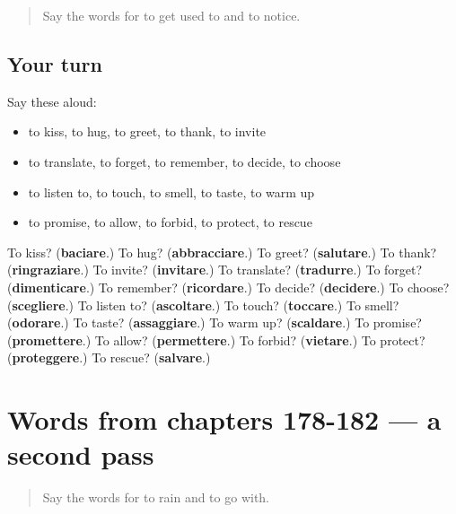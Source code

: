 \label{lesson:IT-R182-first-pass-words-from-chapters-174-177}



\begin{quote}
Say the words for to get used to and to notice.
\end{quote}

\subsection*{Your turn}
Say these aloud:

\begin{itemize}
\raggedright
  \item to kiss, to hug, to greet, to thank, to invite
  \item to translate, to forget, to remember, to decide, to choose
  \item to listen to, to touch, to smell, to taste, to warm up
  \item to promise, to allow, to forbid, to protect, to rescue
\end{itemize}

\begin{tcolorbox}[breakable,colback=teal!4,colframe=teal!35!black,title={Before you move on}]
To kiss? (\textbf{baciare}.) To hug? (\textbf{abbracciare}.) To greet? (\textbf{salutare}.) To thank? (\textbf{ringraziare}.) To invite? (\textbf{invitare}.) To translate? (\textbf{tradurre}.) To forget? (\textbf{dimenticare}.) To remember? (\textbf{ricordare}.) To decide? (\textbf{decidere}.) To choose? (\textbf{scegliere}.) To listen to? (\textbf{ascoltare}.) To touch? (\textbf{toccare}.) To smell? (\textbf{odorare}.) To taste? (\textbf{assaggiare}.) To warm up? (\textbf{scaldare}.) To promise? (\textbf{promettere}.) To allow? (\textbf{permettere}.) To forbid? (\textbf{vietare}.) To protect? (\textbf{proteggere}.) To rescue? (\textbf{salvare}.)
\end{tcolorbox}
\section[(dialogue)]{Words from chapters 178-182 — a second pass}

\label{lesson:IT-R182-second-pass-words-from-chapters-178-182}



\begin{quote}
Say the words for to rain and to go with.
\end{quote}

